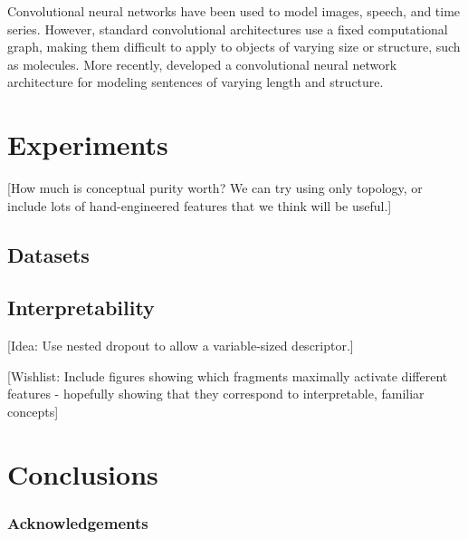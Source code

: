 \documentclass{article}
\begin{document}
Convolutional neural networks have been used to model images, speech, and time series\citep{lecun1995convolutional}.
However, standard convolutional architectures use a fixed computational graph, making them difficult to apply to objects of varying size or structure, such as molecules.
More recently, \citet{KalchbrennerACL2014} developed a convolutional neural network architecture for modeling sentences of varying length and structure.


\section{Experiments}

[How much is conceptual purity worth?  We can try using only topology, or include lots of hand-engineered features that we think will be useful.]

\subsection{Datasets}

\subsection{Interpretability}

[Idea: Use nested dropout to allow a variable-sized descriptor.]

[Wishlist: Include figures showing which fragments maximally activate different features - hopefully showing that they correspond to interpretable, familiar concepts]


\section{Conclusions}


\subsubsection*{Acknowledgements}



\end{document}
